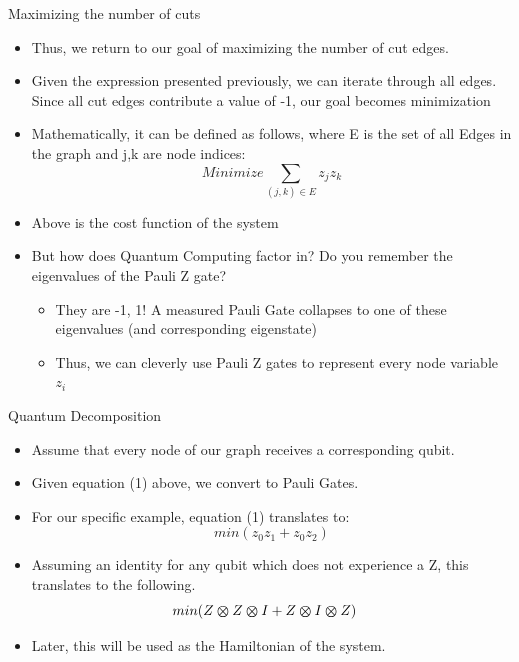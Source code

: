 \begin{frame}{Maximizing the number of cuts}
    \begin{itemize}
        \item Thus, we return to our goal of maximizing the number of cut edges.
        \item Given the expression presented previously, we can iterate through all edges. Since all cut edges contribute a value of -1, our goal becomes minimization
        \item Mathematically, it can be defined as follows, where E  is the set of all Edges in the graph and j,k are node indices:
        \begin{equation}
            Minimize \sum_{(j,k) \in E} z_j z_k
        \end{equation}
        \item Above is the cost function of the system

        \item But how does Quantum Computing factor in? Do you remember the eigenvalues of the Pauli Z gate? 
        \begin{itemize}
            \item They are -1, 1! A measured Pauli Gate collapses to one of these eigenvalues (and corresponding eigenstate)
            \item Thus, we can cleverly use Pauli Z gates to represent every node variable $z_i$
        \end{itemize}
    \end{itemize}
    
\end{frame}

\begin{frame}{Quantum Decomposition}
\begin{itemize}
    \item Assume that every node of our graph receives a corresponding qubit. 
    \item Given equation (1) above, we convert to Pauli Gates.
    \item For our specific example, equation (1) translates to: 
    \begin{equation}
        min(z_0 z_1 + z_0 z_ 2)
    \end{equation}
    \item Assuming an identity for any qubit which does not experience a Z, this translates to the following.  
    \begin{equation}
        min(Z \bm{\otimes} Z \bm{\otimes} I + Z \bm{\otimes} I \bm{\otimes} Z) \quad 
    \end{equation}
    \item Later, this will be used as the Hamiltonian of the system.
\end{itemize}
    
\end{frame}

